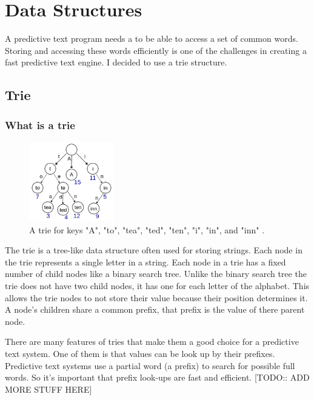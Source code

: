 \documentclass[10pt]{article} %
\begin{document}
	\section{Data Structures}
		A predictive text program needs a to be able to access a set of common words.
		 Storing and accessing these words efficiently is one of the challenges in creating a fast predictive text engine.
		  I decided to use a trie\cite{book:ADS:trie} structure.
		  
		\subsection{Trie}
			\subsubsection{What is a trie}
			
				\begin{figure} %
    				\centering
    				\includegraphics[width=0.33\textwidth]{Trie_example}
    				\caption{A trie for keys "A", "to", "tea", "ted", "ten", "i", "in", and "inn" \cite{fig:Trie_example}. }
    				\label{fig:Trie_example}
				\end{figure}
				
				The trie is a tree-like data structure often used for storing strings. Each node in the trie represents a single letter in a string. Each node in a trie has a fixed number of child nodes like a binary search tree. Unlike the binary search tree the trie does not have two child nodes, it has one for each letter of the alphabet. This allows the trie nodes to not store their value because their position determines it. A node's children share a common prefix, that prefix is the value of there parent node.

                There are many features of tries that make them a good choice for a predictive text system. One of them is that values can be look up by their prefixes. Predictive text systems use a partial word (a prefix) to search for possible full words. So it's important that prefix look-ups are fast and efficient. [TODO:: ADD MORE STUFF HERE]
				
\end{document}
